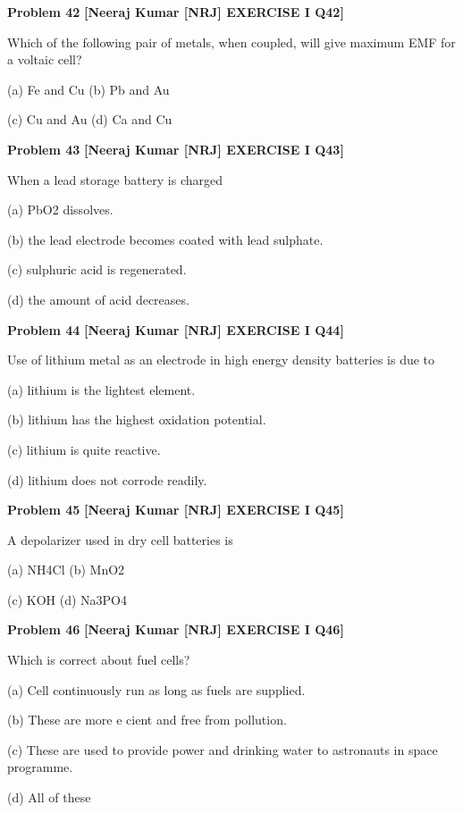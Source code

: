 \begin{problembox}
\textbf{Problem 42} \hfill \textbf{[Neeraj Kumar [NRJ] EXERCISE I Q42]}
\label{q:ext-nrj_all_questions-42}

Which of the following pair of metals, when 
coupled, will give maximum EMF for a voltaic cell?
 
 (a) Fe and Cu 
(b) Pb and Au
 
 (c) Cu and Au 
(d) Ca and Cu
\end{problembox}

\begin{problembox}
\textbf{Problem 43} \hfill \textbf{[Neeraj Kumar [NRJ] EXERCISE I Q43]}
\label{q:ext-nrj_all_questions-43}

When a lead storage battery is charged
 
 (a) PbO2 dissolves.
 
 (b)  the lead electrode becomes coated with lead 
sulphate.
 
 (c) sulphuric acid is regenerated.
 
 (d) the amount of acid decreases.
\end{problembox}

\begin{problembox}
\textbf{Problem 44} \hfill \textbf{[Neeraj Kumar [NRJ] EXERCISE I Q44]}
\label{q:ext-nrj_all_questions-44}

Use of lithium metal as an electrode in high energy 
density batteries is due to
 
 (a) lithium is the lightest element.
 
 (b)  lithium has the highest oxidation potential.
 
 (c) lithium is quite reactive.
 
 (d) lithium does not corrode readily.
\end{problembox}

\begin{problembox}
\textbf{Problem 45} \hfill \textbf{[Neeraj Kumar [NRJ] EXERCISE I Q45]}
\label{q:ext-nrj_all_questions-45}

A depolarizer used in dry cell batteries is
 
 (a) NH4Cl 
(b) MnO2
 
 (c) KOH 
(d) Na3PO4
\end{problembox}

\begin{problembox}
\textbf{Problem 46} \hfill \textbf{[Neeraj Kumar [NRJ] EXERCISE I Q46]}
\label{q:ext-nrj_all_questions-46}

Which is correct about fuel cells?
 
 (a)  Cell continuously run as long as fuels are 
supplied.
 
 (b)  These are more e   cient and free from 
pollution.
 
 (c)  These are used to provide power and drinking 
water to astronauts in space programme.
 
 (d) All of these
\end{problembox}

